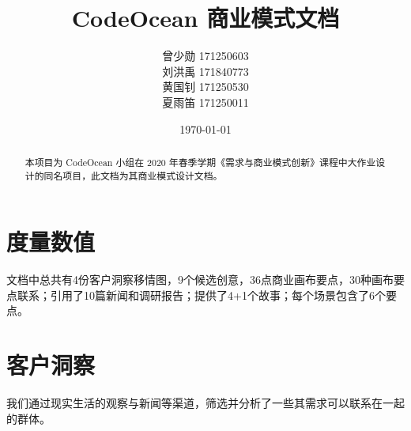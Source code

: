\documentclass[a4paper]{ctexart}
\title{CodeOcean 商业模式文档}
\author{
  曾少勋 171250603\\
  刘洪禹 171840773\\
  黄国钊 171250530\\
  夏雨笛 171250011\\
}
\date{\today}
\begin{document}
\maketitle

\begin{abstract}
  本项目为 CodeOcean 小组在 2020 年春季学期《需求与商业模式创新》课程中大作业设计的同名项目，此文档为其商业模式设计文档。
\end{abstract}

\tableofcontents

\newpage

\setlength{\parskip}{1em}

\section{度量数值}
文档中总共有4份客户洞察移情图，9个候选创意，36点商业画布要点，30种画布要点联系；引用了10篇新闻和调研报告；提供了4+1个故事；每个场景包含了6个要点。


\section{客户洞察}

我们通过现实生活的观察与新闻等渠道，筛选并分析了一些其需求可以联系在一起的群体。
\end{document}
